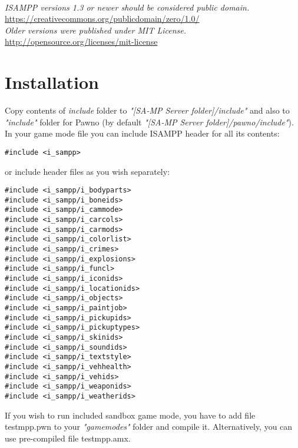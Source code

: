 \documentclass{article}
\begin{document}
\textit{\\ISAMPP versions 1.3 or newer should be considered public domain.}
\\\url{https://creativecommons.org/publicdomain/zero/1.0/}
\bigskip
\\\textit{Older versions were published under MIT License.}
\\\url{http://opensource.org/licenses/mit-license}

\section{Installation}
Copy contents of \textit{include} folder to \textit{"[SA-MP Server folder]/include"} and also to \textit{"include"} folder for Pawno (by default \textit{"[SA-MP Server folder]/pawno/include"}).
\\In your game mode file you can include ISAMPP header for all its contents:
\begin{verbatim}
#include <i_sampp>
\end{verbatim}
or include header files as you wish separately:
\begin{verbatim}
#include <i_sampp/i_bodyparts>
#include <i_sampp/i_boneids>
#include <i_sampp/i_cammode>
#include <i_sampp/i_carcols>
#include <i_sampp/i_carmods>
#include <i_sampp/i_colorlist>
#include <i_sampp/i_crimes>
#include <i_sampp/i_explosions>
#include <i_sampp/i_funcl>
#include <i_sampp/i_iconids>
#include <i_sampp/i_locationids>
#include <i_sampp/i_objects>
#include <i_sampp/i_paintjob>
#include <i_sampp/i_pickupids>
#include <i_sampp/i_pickuptypes>
#include <i_sampp/i_skinids>
#include <i_sampp/i_soundids>
#include <i_sampp/i_textstyle>
#include <i_sampp/i_vehhealth>
#include <i_sampp/i_vehids>
#include <i_sampp/i_weaponids>
#include <i_sampp/i_weatherids>
\end{verbatim}
If you wish to run included sandbox game mode, you have to add file testmpp.pwn to your \textit{"gamemodes"} folder and compile it. Alternatively, you can use pre-compiled file testmpp.amx.

\newpage
\end{document}

